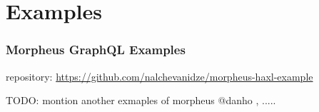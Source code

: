 \section{Examples}

\begin{frame}\frametitle{Morpheus GraphQL Examples}
  




repository: \url{https://github.com/nalchevanidze/morpheus-haxl-example}

TODO: montion another exmaples of morpheus @danho , .....

\end{frame}